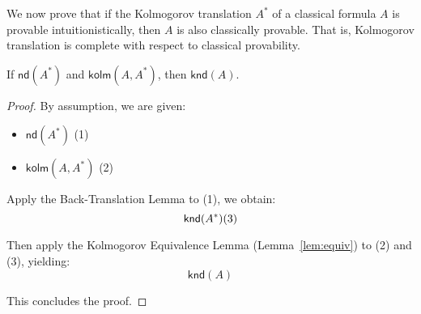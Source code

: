 \documentclass{article}
\begin{document}
    \bigskip

    We now prove that if the Kolmogorov translation $A^*$ of a classical formula $A$ is provable intuitionistically, then $A$ is also classically provable. That is, Kolmogorov translation is complete with respect to classical provability.


    \label{lem:completeness}
    If $\textsf{nd}(A^*)$ and $\textsf{kolm}(A, A^*)$, then $\textsf{knd}(A)$.
    
    
    \begin{proof}
    By assumption, we are given:
    \begin{itemize}
        \item $\textsf{nd}(A^*)$ \hfill (1)
        \item $\textsf{kolm}(A, A^*)$ \hfill (2)
    \end{itemize}
    
    Apply the Back-Translation Lemma to (1), we obtain:
    \[
    \textsf{knd}(A^*) \hfill (3)
    \]
    
    Then apply the Kolmogorov Equivalence Lemma (Lemma~\ref{lem:equiv}) to (2) and (3), yielding:
    \[
    \textsf{knd}(A)
    \]
    
    This concludes the proof.
    \end{proof}






















  
  
\end{document}
